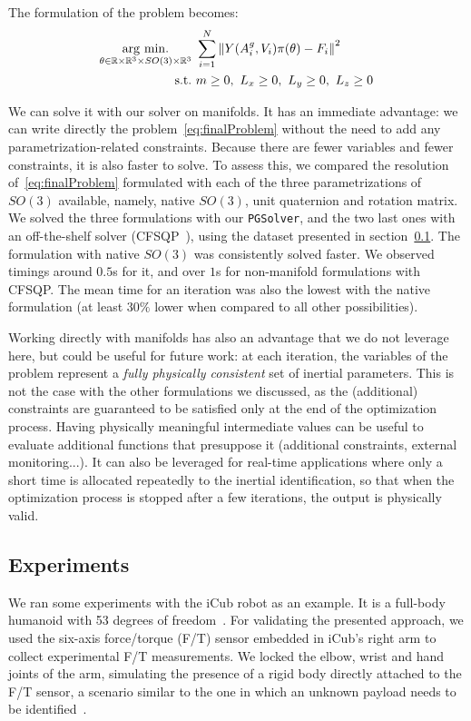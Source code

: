 The formulation of the problem becomes:
\begin{equation}
\begin{aligned}
\label{eq:finalProblem}
    \operatorname*{arg\ min.}_{\theta \in \mathbb{R}\times\mathbb{R}^3\times SO(3) \times \mathbb{R}^3} &\ \sum_{i = 1}^N \left\| Y(A^g_i, V_i) \pi(\theta) - F_i \right\|^2 \\
    \mbox{s.t.} &\ m \geq 0,\ L_x \geq 0,\ L_y \geq 0,\ L_z \geq 0
\end{aligned}
\end{equation}

We can solve it with our solver on manifolds.
It has an immediate advantage: we can write directly the problem~\eqref{eq:finalProblem} without the need to add any parametrization-related constraints.
Because there are fewer variables and fewer constraints, it is also faster to solve.
To assess this, we compared the resolution of~\eqref{eq:finalProblem} formulated with each of the three parametrizations of $SO(3)$ available, namely, native $SO(3)$, unit quaternion and rotation matrix.
We solved the three formulations with our {\tt PGSolver}, and the two last ones with an off-the-shelf solver (CFSQP~\cite{cfsqp:manual}), using the dataset presented in section~\ref{sub:experiments}.
The formulation with native $SO(3)$ was consistently solved faster.
We observed timings around $0.5$s for it, and over $1$s for non-manifold formulations with CFSQP.
The mean time for an iteration was also the lowest with the native formulation (at least $30\%$ lower when compared to all other possibilities).

Working directly with manifolds has also an advantage that we do not leverage here, but could be useful for future work: at each iteration, the variables of the problem represent a \emph{fully physically consistent} set of inertial parameters.
This is not the case with the other formulations we discussed, as the (additional) constraints are guaranteed to be satisfied only at the end of the optimization process.
Having physically meaningful intermediate values can be useful to evaluate additional functions that presuppose it (additional constraints, external monitoring...).
It can also be leveraged for real-time applications where only a short time is allocated repeatedly to the inertial identification, so that when the optimization process is stopped after a few iterations, the output is physically valid.

\subsection{Experiments}
\label{sub:experiments}
We ran some experiments with the iCub robot as an example.
It is a full-body humanoid with 53 degrees of freedom~\cite{metta2010icub}.
For validating the presented approach, we used the six-axis force/torque (F/T) sensor embedded in iCub's right arm to collect experimental F/T measurements.
We locked the elbow, wrist and hand joints of the arm, simulating the presence of a rigid body directly attached to the F/T sensor, a scenario similar to the one in which an unknown payload needs to be identified~\cite{kubus2008line}.

